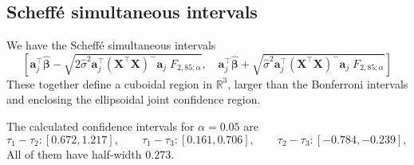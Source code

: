 \documentclass[10pt]{article}
\renewcommand{\vec}{\bm}
\newcommand{\R}{\mathbb{R}}
\begin{document}
    \subsection{Scheff\'e simultaneous intervals}

    We have the Scheff\'e simultaneous intervals
    \[
        \left[
        \vec{a}_j^\top\hat{\vec{\beta}} - \sqrt{2\hat{\sigma}^2
        \vec{a}_j^\top(\vec{X}^\top \vec{X})^-\vec{a}_j\; F_{2, 85; \alpha}}, \quad
        \vec{a}_j^\top\hat{\vec{\beta}} + \sqrt{\hat{\sigma}^2
        \vec{a}_j^\top(\vec{X}^\top \vec{X})^-\vec{a}_j\; F_{2, 85; \alpha}}
        \right]
    \] These together define a cuboidal region in $\R^3$, larger than the Bonferroni
    intervals and enclosing the ellipsoidal joint confidence region.

    The calculated confidence intervals for $\alpha = 0.05$ are \[
        \tau_1 - \tau_2 : [0.672, 1.217], \qquad
        \tau_1 - \tau_3 : [0.161, 0.706], \qquad
        \tau_2 - \tau_3 : [-0.784, -0.239], \qquad
    \] All of them have half-width $0.273$.
\end{document}
